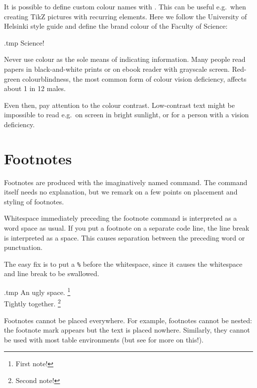 It is possible to define custom colour names with .
This can be useful e.g.\ when creating TikZ pictures with recurring elements.
Here we follow the University of Helsinki style guide
and define the brand colour of the Faculty of Science:
%
\begin{VerbatimOut}{\jobname.tmp}
\textcolor{Sciency}{Science!}
\end{VerbatimOut}
\ShowExample

\begin{practices}
Never use colour as the sole means of indicating information.
Many people read papers in black-and-white prints
or on ebook reader with grayscale screen.
Red-green colourblindness,
the most common form of colour vision deficiency,
affects about 1 in 12 males.

Even then, pay attention to the colour contrast.
Low-contrast text might be impossible to read e.g.\ on screen in bright sunlight,
or for a person with a vision deficiency.
\end{practices}


%
%
%
\section{Footnotes}\label{sec:footnotes}

Footnotes are produced with the imaginatively named  command.
The command itself needs no explanation,
but we remark on a few points on placement and styling of footnotes.

\begin{gotcha}
Whitespace immediately preceding the footnote command is interpreted as a word space as usual.
If you put a footnote on a separate code line,
the line break is interpreted as a space.
This causes separation between the preceding word or punctuation.

The easy fix is to put a \verb|%| before the whitespace,
since it causes the whitespace and line break to be swallowed.
\begin{VerbatimOut}{\jobname.tmp}
An ugly space.
\footnote{First note!}\\

Tightly together.%
\footnote{Second note!}
\end{VerbatimOut}
\ShowExample
\end{gotcha}

Footnotes cannot be placed everywhere.
For example, footnotes cannot be nested:
the footnote mark appears but the text is placed nowhere.
Similarly, they cannot be used with most table environments
(but see  for more on this!).

